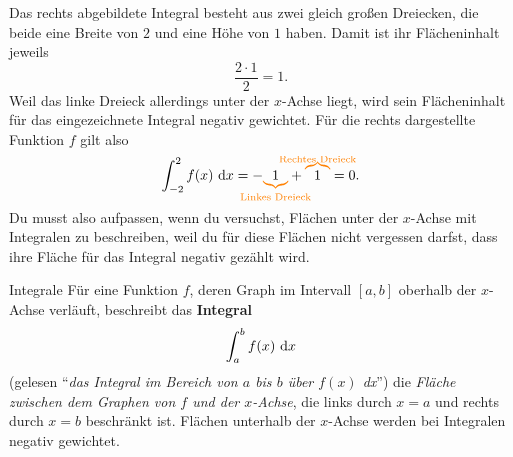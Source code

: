 \documentclass[../../main.tex]{subfiles}
\begin{document}
\begin{example}{}
    Das rechts abgebildete Integral besteht aus zwei gleich großen Dreiecken, die beide eine Breite von $2$ und eine 
    Höhe von $1$ haben. Damit ist ihr Flächeninhalt jeweils
    \[\frac{2\cdot 1}{2}=1.\]
    Weil das linke Dreieck allerdings unter der $x$-Achse liegt, wird sein Flächeninhalt für das eingezeichnete Integral
    negativ gewichtet. Für die rechts dargestellte Funktion $f$ gilt also
    \[\int_{-2}^2f(x)\diff x=-\colorbrace{1}{\text{Linkes Dreieck}}+\colorobrace{1}{\text{Rechtes Dreieck}}=0.\]
    Du musst also aufpassen, wenn du versuchst, Flächen unter der $x$-Achse mit Integralen zu beschreiben, weil du für
    diese Flächen nicht vergessen darfst, dass ihre Fläche für das Integral negativ gezählt wird.
\end{example}
\begin{nutshell}{Integrale}
    Für eine Funktion $f$, deren Graph im Intervall $[a,b]$ oberhalb der $x$-Achse verläuft, beschreibt das \textbf{Integral}
    \[\int_a^bf(x)\mathop{}\mathrm{d} x\]
    (gelesen \enquote{\emph{das Integral im Bereich von $a$ bis $b$ über $f(x)$ dx}}) die \emph{Fläche zwischen dem Graphen von $f$ und der $x$-Achse}, die links durch $x=a$ und rechts durch $x=b$ 
    beschränkt ist. Flächen unterhalb der $x$-Achse werden bei Integralen negativ gewichtet.
\end{nutshell}
\end{document}

